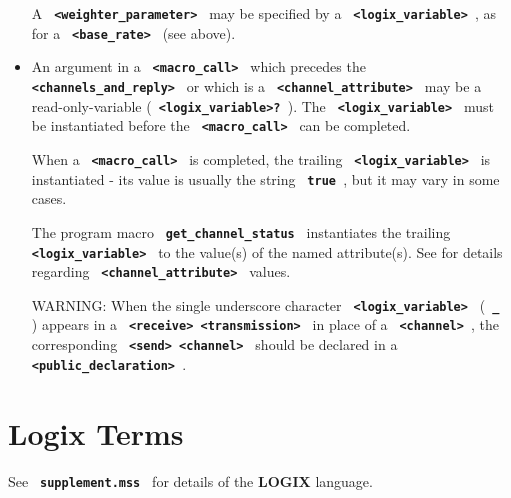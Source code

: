 \documentclass[twoside,10pt]{report}
\begin{document}
\begin{itemize}
\noindent
A {\bf \verb+ <weighter_parameter> +} may be specified by a
{\bf \verb+ <logix_variable> +}, as for a {\bf \verb+ <base_rate> +}
(see above).

\item
An argument in a {\bf \verb+ <macro_call> +} which precedes the \linebreak
{\bf \verb+ <channels_and_reply> +} or which is a
{\bf \verb+ <channel_attribute> +}
may be a read-only-variable
({\bf \verb+ <logix_variable>? +}).
The {\bf \verb+ <logix_variable> +}  \linebreak 
must be instantiated before the
{\bf \verb+ <macro_call> +} can be completed.

\noindent
When a {\bf \verb+ <macro_call> +} is completed, the trailing \linebreak
{\bf \verb+ <logix_variable> +} is instantiated - its value is usually the
string {\bf \verb+ true +}, but it may vary in some cases.

\noindent
The program macro {\bf \verb+ get_channel_status +}
instantiates the trailing \linebreak
{\bf \verb+ <logix_variable> +} to the value(s) of the named attribute(s).
See   for details regarding
{\bf \verb+ <channel_attribute> +} \linebreak values.

\noindent
WARNING: When the single underscore character {\bf \verb+ <logix_variable> +}
\linebreak ({\bf \verb+ _ +}) appears
in a {\bf \verb+ <receive> <transmission> +} in place of a \linebreak
{\bf \verb+ <channel> +}, the corresponding {\bf \verb+ <send> <channel> +}
should be declared in a {\bf \verb+ <public_declaration> +}.
\end{itemize}

\section{Logix Terms}
See {\bf \verb+ supplement.mss +} for details of the {\bf LOGIX} language.
\end{document}
